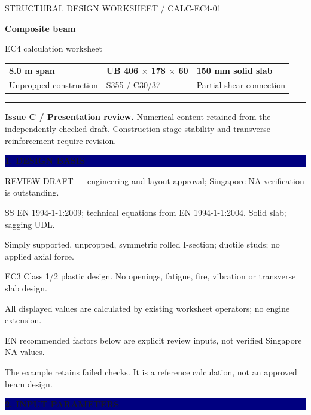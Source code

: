 \documentclass[a4paper,10pt]{article}
\newcommand{\sect}[1]{\Needspace{30mm}\vspace{10pt}\noindent\colorbox{navy}{\parbox{\dimexpr\linewidth-2\fboxsep}{\vspace{4pt}\color{white}\large\bfseries #1\vspace{4pt}}}\par\vspace{3pt}}
\begin{document}
{\small\color{muted}STRUCTURAL DESIGN WORKSHEET / CALC-EC4-01}\par
{\fontsize{25}{29}\selectfont\bfseries\color{navy}Composite beam}\par
{\Large\color{navy}EC4 calculation worksheet}\par
\vspace{5pt}
\begin{tabular*}{\linewidth}{@{\extracolsep{\fill}}lll@{}}
\textbf{8.0 m span} & \textbf{UB 406 $\times$ 178 $\times$ 60} & \textbf{150 mm solid slab}\\
Unpropped construction & S355 / C30/37 & Partial shear connection
\end{tabular*}\par
\vspace{8pt}\hrule\vspace{5pt}
{\small\textbf{Issue C / Presentation review.} Numerical content retained from the independently checked draft. Construction-stage stability and transverse reinforcement require revision.}\par
\sect{1. DESIGN BASIS}
{\small\color{muted}REVIEW DRAFT — engineering and layout approval; Singapore NA verification is outstanding.}\par
{\small\color{muted}SS EN 1994-1-1:2009; technical equations from EN 1994-1-1:2004. Solid slab; sagging UDL.}\par
{\small\color{muted}Simply supported, unpropped, symmetric rolled I-section; ductile studs; no applied axial force.}\par
{\small\color{muted}EC3 Class 1/2 plastic design. No openings, fatigue, fire, vibration or transverse slab design.}\par
{\small\color{muted}All displayed values are calculated by existing worksheet operators; no engine extension.}\par
{\small\color{muted}EN recommended factors below are explicit review inputs, not verified Singapore NA values.}\par
{\small\color{muted}The example retains failed checks. It is a reference calculation, not an approved beam design.}\par
\sect{2. INPUT PARAMETERS}
\Needspace{22mm}\par
\end{document}
